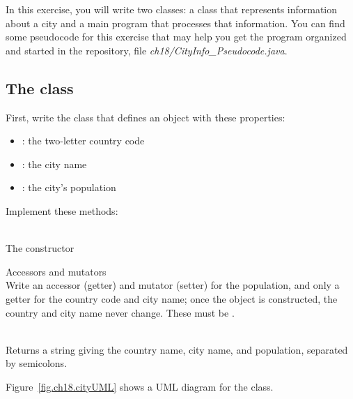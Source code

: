 \begin{exercise}

In this exercise, you will write two classes: a class that represents information about a city and a main program that processes that information. You can find some pseudocode for this exercise that may help you get the program organized and started in the repository, file {\em ch18/CityInfo\_Pseudocode.java}.

\subsection{The  class}

First, write the  class that defines an object with these properties:

\begin{itemize}
    \item {}: the two-letter country code
    \item {}: the city name
    \item {}: the city's population
\end{itemize}

Implement these methods:

\begin{description}
    \item [\texttt{public City(String country, String name, int population)}] \hfill \\ The constructor
    \item Accessors and mutators \hfill \\ Write an accessor (getter) and mutator (setter) for the population, and only a getter for the country code and city name; once the object is constructed, the country and city name never change. These must be .
    \item [\texttt{public String toString()}] \hfill \\ Returns a string giving the country name, city name, and population, separated by semicolons.
\end{description}

Figure~\ref{fig.ch18.cityUML} shows a UML diagram for the  class.


\end{exercise}
